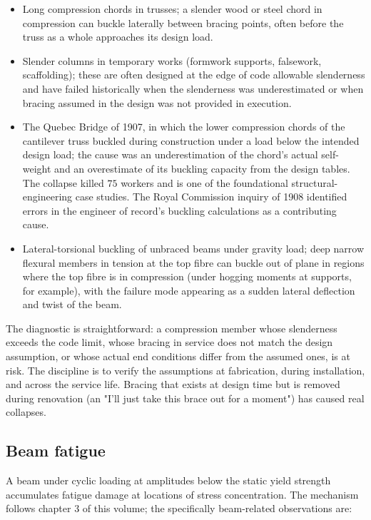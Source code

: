 \begin{itemize}[leftmargin=*]
  \item Long compression chords in trusses; a slender wood or steel
    chord in compression can buckle laterally between bracing
    points, often before the truss as a whole approaches its
    design load.
  \item Slender columns in temporary works (formwork supports,
    falsework, scaffolding); these are often designed at the edge
    of code allowable slenderness and have failed historically when
    the slenderness was underestimated or when bracing assumed in
    the design was not provided in execution.
  \item The Quebec Bridge of 1907, in which the lower compression
    chords of the cantilever truss buckled during construction
    under a load below the intended design load; the cause was an
    underestimation of the chord's actual self-weight and an
    overestimate of its buckling capacity from the design tables.
    The collapse killed $75$ workers and is one of the foundational
    structural-engineering case studies. The Royal Commission
    inquiry of 1908 identified errors in the engineer of record's
    buckling calculations as a contributing cause.
  \item Lateral-torsional buckling of unbraced beams under gravity
    load; deep narrow flexural members in tension at the top fibre
    can buckle out of plane in regions where the top fibre is in
    compression (under hogging moments at supports, for example),
    with the failure mode appearing as a sudden lateral deflection
    and twist of the beam.
\end{itemize}

The diagnostic is straightforward: a compression member whose
slenderness exceeds the code limit, whose bracing in service does
not match the design assumption, or whose actual end conditions
differ from the assumed ones, is at risk. The discipline is to
verify the assumptions at fabrication, during installation, and
across the service life. Bracing that exists at design time but is
removed during renovation (an "I'll just take this brace out for a
moment") has caused real collapses.

\subsection{Beam fatigue}

A beam under cyclic loading at amplitudes below the static yield
strength accumulates fatigue damage at locations of stress
concentration. The mechanism follows chapter 3 of this volume; the
specifically beam-related observations are:


